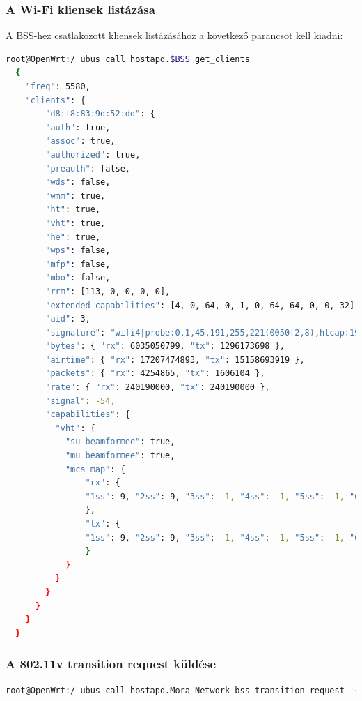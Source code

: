 \documentclass[12pt]{article}
\begin{document}
\subsubsection{A Wi-Fi kliensek listázása}

A BSS-hez csatlakozott kliensek listázásához a következő parancsot kell kiadni:

\begin{lstlisting}[language=Bash]
  root@OpenWrt:/ ubus call hostapd.$BSS get_clients
  {
    "freq": 5580,
    "clients": {
        "d8:f8:83:9d:52:dd": {
        "auth": true,
        "assoc": true,
        "authorized": true,
        "preauth": false,
        "wds": false,
        "wmm": true,
        "ht": true,
        "vht": true,
        "he": true,
        "wps": false,
        "mfp": false,
        "mbo": false,
        "rrm": [113, 0, 0, 0, 0],
        "extended_capabilities": [4, 0, 64, 0, 1, 0, 64, 64, 0, 0, 32],
        "aid": 3,
        "signature": "wifi4|probe:0,1,45,191,255,221(0050f2,8),htcap:19ef,htagg:17,htmcs:0000ffff,vhtcap:039071f6,vhtrxmcs:0000fffa,vhttxmcs:2000fffa|assoc:0,1,33,36,48,45,127,191,255,221(001735,8),70,59,221(0050f2,2),htcap:19ef,htagg:17,htmcs:0000ffff,vhtcap:039051f6,vhtrxmcs:0000fffa,vhttxmcs:2000fffa,txpow:1600,extcap:0400400001004040000020",
        "bytes": { "rx": 6035050799, "tx": 1296173698 },
        "airtime": { "rx": 17207474893, "tx": 15158693919 },
        "packets": { "rx": 4254865, "tx": 1606104 },
        "rate": { "rx": 240190000, "tx": 240190000 },
        "signal": -54,
        "capabilities": {
          "vht": {
            "su_beamformee": true,
            "mu_beamformee": true,
            "mcs_map": {
                "rx": {
                "1ss": 9, "2ss": 9, "3ss": -1, "4ss": -1, "5ss": -1, "6ss": -1, "7ss": -1, "8ss": -1
                },
                "tx": {
                "1ss": 9, "2ss": 9, "3ss": -1, "4ss": -1, "5ss": -1, "6ss": -1, "7ss": -1, "8ss": -1
                }
            }
          }
        }
      }
    }
  }
\end{lstlisting}

\subsubsection{A 802.11v transition request küldése}


\begin{lstlisting}[language=Bash]
  root@OpenWrt:/ ubus call hostapd.Mora_Network bss_transition_request '{"addr": "50:3D:C6:5B:81:E5", "reassoc_delay": 10, "disassociation_timer": 5, "validity_period": 30, "abridged": 1}' && sleep 5 && ubus call hostapd.Mora_Network del_client '{"addr" : "50:3D:C6:5B:81:E5", "deauth": true, "ban_time": 10000 }'
\end{lstlisting}
\end{document}
